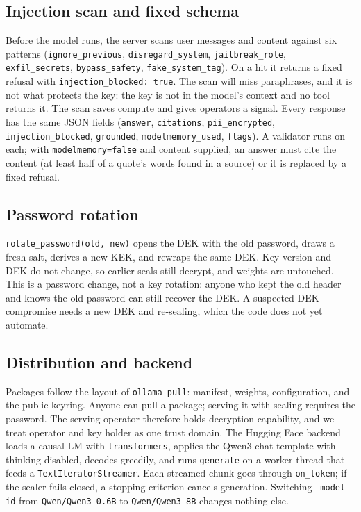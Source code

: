 \documentclass[conference]{IEEEtran}
\newcommand{\code}[1]{\texttt{#1}}
\begin{document}
\subsection{Injection scan and fixed schema}
\label{sec:injection}

Before the model runs, the server scans user messages and content against six patterns (\code{ignore\_previous}, \code{disregard\_system}, \code{jailbreak\_role}, \code{exfil\_secrets}, \code{bypass\_safety}, \code{fake\_system\_tag}). On a hit it returns a fixed refusal with \code{injection\_blocked: true}. The scan will miss paraphrases, and it is not what protects the key: the key is not in the model's context and no tool returns it. The scan saves compute and gives operators a signal. Every response has the same JSON fields (\code{answer}, \code{citations}, \code{pii\_encrypted}, \code{injection\_blocked}, \code{grounded}, \code{modelmemory\_used}, \code{flags}). A validator runs on each; with \code{modelmemory=false} and content supplied, an answer must cite the content (at least half of a quote's words found in a source) or it is replaced by a fixed refusal.

\subsection{Password rotation}
\label{sec:rotation}

\code{rotate\_password(old, new)} opens the DEK with the old password, draws a fresh salt, derives a new KEK, and rewraps the same DEK. Key version and DEK do not change, so earlier seals still decrypt, and weights are untouched. This is a password change, not a key rotation: anyone who kept the old header and knows the old password can still recover the DEK. A suspected DEK compromise needs a new DEK and re-sealing, which the code does not yet automate.

\subsection{Distribution and backend}
\label{sec:backend}

Packages follow the layout of \code{ollama pull}: manifest, weights, configuration, and the public keyring. Anyone can pull a package; serving it with sealing requires the password. The serving operator therefore holds decryption capability, and we treat operator and key holder as one trust domain. The Hugging Face backend loads a causal LM with \code{transformers}, applies the Qwen3 chat template with thinking disabled, decodes greedily, and runs \code{generate} on a worker thread that feeds a \code{TextIteratorStreamer}. Each streamed chunk goes through \code{on\_token}; if the sealer fails closed, a stopping criterion cancels generation. Switching \code{--model-id} from \code{Qwen/Qwen3-0.6B} to \code{Qwen/Qwen3-8B} changes nothing else.
\end{document}
